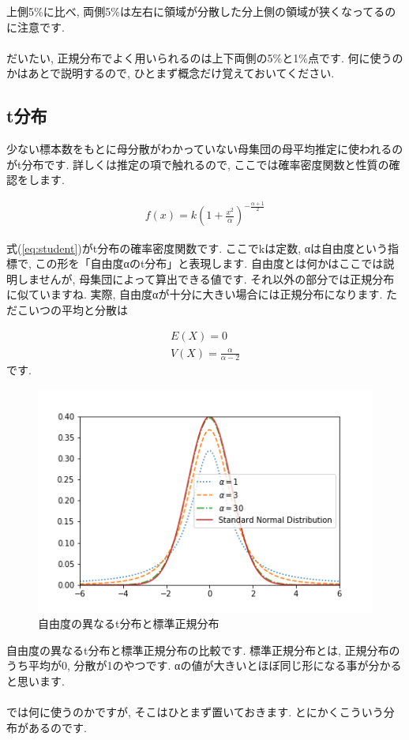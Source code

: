 \documentclass[11pt,a4paper,uplatex]{ujreport} 	%
\begin{document}
上側5\%に比べ, 両側5\%は左右に領域が分散した分上側の領域が狭くなってるのに注意です. \\
\\
だいたい, 正規分布でよく用いられるのは上下両側の5\%と1\%点です. 何に使うのかはあとで説明するので, ひとまず概念だけ覚えておいてください.

\subsection{t分布}
少ない標本数をもとに母分散がわかっていない母集団の母平均推定に使われるのがt分布です. 詳しくは推定の項で触れるので, ここでは確率密度関数と性質の確認をします.

\begin{eqnarray}
\label{eq:student}
f(x) = k(1 + \frac{x^2}{\alpha})^{-\frac{\alpha+1}{2}}
\end{eqnarray}

式(\ref{eq:student})がt分布の確率密度関数です. ここでkは定数, αは自由度という指標で, この形を「自由度αのt分布」と表現します. 自由度とは何かはここでは説明しませんが, 母集団によって算出できる値です. それ以外の部分では正規分布に似ていますね. 実際, 自由度αが十分に大きい場合には正規分布になります. ただこいつの平均と分散は

\begin{eqnarray}
E(X) = 0\\
V(X) = \frac{\alpha}{\alpha-2}
\end{eqnarray}
です. 

\begin{figure}[H]
\label{im:student}
  \centering
  \includegraphics[width=120mm,bb=0 0 432 288]{figures/student.png}
  \caption{自由度の異なるt分布と標準正規分布}
\end{figure}
自由度の異なるt分布と標準正規分布の比較です. 標準正規分布とは, 正規分布のうち平均が0, 分散が1のやつです. αの値が大きいとほぼ同じ形になる事が分かると思います.\\
\\
では何に使うのかですが, そこはひとまず置いておきます. とにかくこういう分布があるのです.
\end{document}
